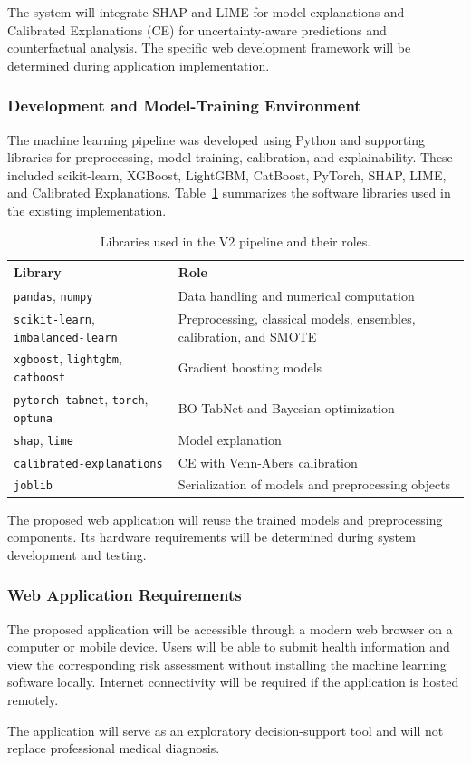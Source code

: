 The system will integrate SHAP and LIME for model explanations and Calibrated Explanations (CE) for uncertainty-aware predictions and counterfactual analysis. The specific web development framework will be determined during application implementation.

\subsubsection{Development and Model-Training Environment}

The machine learning pipeline was developed using Python and supporting libraries for preprocessing, model training, calibration, and explainability. These included scikit-learn, XGBoost, LightGBM, CatBoost, PyTorch, SHAP, LIME, and Calibrated Explanations. Table~\ref{tab:dev_environment} summarizes the software libraries used in the existing implementation.

\begin{table}[H]
\centering
\caption{Libraries used in the V2 pipeline and their roles.}
\label{tab:dev_environment}
\begin{tabular}{p{4.6cm}p{8cm}}
\hline
\textbf{Library} & \textbf{Role} \\
\hline
\texttt{pandas}, \texttt{numpy} & Data handling and numerical computation \\
\texttt{scikit-learn}, \texttt{imbalanced-learn} & Preprocessing, classical models, ensembles, calibration, and SMOTE \\
\texttt{xgboost}, \texttt{lightgbm}, \texttt{catboost} & Gradient boosting models \\
\texttt{pytorch-tabnet}, \texttt{torch}, \texttt{optuna} & BO-TabNet and Bayesian optimization \\
\texttt{shap}, \texttt{lime} & Model explanation \\
\texttt{calibrated-explanations} & CE with Venn-Abers calibration \\
\texttt{joblib} & Serialization of models and preprocessing objects \\
\hline
\end{tabular}
\end{table}

The proposed web application will reuse the trained models and preprocessing components. Its hardware requirements will be determined during system development and testing.

\subsubsection{Web Application Requirements}

The proposed application will be accessible through a modern web browser on a computer or mobile device. Users will be able to submit health information and view the corresponding risk assessment without installing the machine learning software locally. Internet connectivity will be required if the application is hosted remotely.

The application will serve as an exploratory decision-support tool and will not replace professional medical diagnosis.
